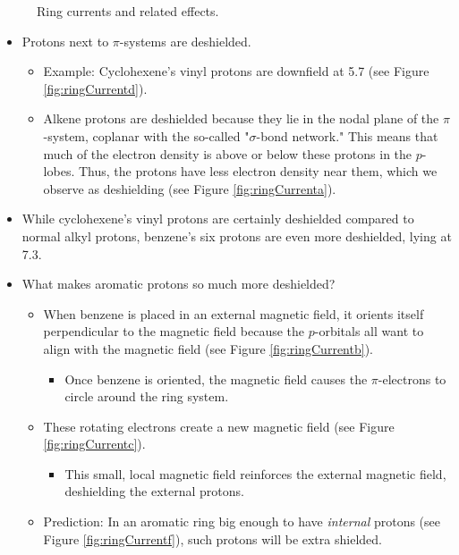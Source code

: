 \documentclass[../notes.tex]{subfiles}
\begin{document}
\begin{itemize}
\begin{figure}[h!]
        \caption{Ring currents and related effects.}
        \label{fig:ringCurrent}
    \end{figure}
    \begin{itemize}
        \item Protons next to $\pi$-systems are deshielded.
        \begin{itemize}
            \item Example: Cyclohexene's vinyl protons are downfield at \SI{5.7}{\partspermillion} (see Figure \ref{fig:ringCurrentd}).
            \item Alkene protons are deshielded because they lie in the nodal plane of the $\pi$-system, coplanar with the so-called "$\sigma$-bond network." This means that much of the electron density is above or below these protons in the $p$-lobes. Thus, the protons have less electron density near them, which we observe as deshielding (see Figure \ref{fig:ringCurrenta}).
        \end{itemize}
        \item While cyclohexene's vinyl protons are certainly deshielded compared to normal alkyl protons, benzene's six protons are even more deshielded, lying at \SI{7.3}{\partspermillion}.
        \item What makes aromatic protons so much more deshielded?
        \begin{itemize}
            \item When benzene is placed in an external magnetic field, it orients itself perpendicular to the magnetic field because the $p$-orbitals all want to align with the magnetic field (see Figure \ref{fig:ringCurrentb}).
            \begin{itemize}
                \item Once benzene is oriented, the magnetic field causes the $\pi$-electrons to circle around the ring system.
            \end{itemize}
            \item These rotating electrons create a new magnetic field (see Figure \ref{fig:ringCurrentc}).
            \begin{itemize}
                \item This small, local magnetic field reinforces the external magnetic field, deshielding the external protons.
            \end{itemize}
            \item Prediction: In an aromatic ring big enough to have \emph{internal} protons (see Figure \ref{fig:ringCurrentf}), such protons will be extra shielded.

\end{itemize}
\end{itemize}
\end{itemize}
\end{document}
